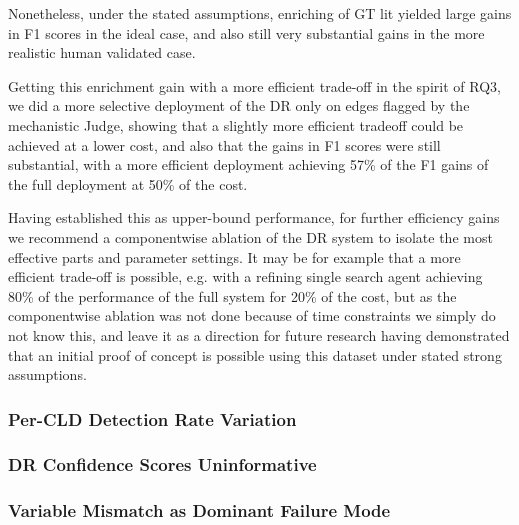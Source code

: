 Nonetheless, under the stated assumptions, enriching of GT lit yielded large gains in F1 scores in the ideal case, and also still very substantial gains in the more realistic human validated case. 

Getting this enrichment gain with a more efficient trade-off in the spirit of RQ3, we did a more selective deployment of the DR only on edges flagged by the mechanistic Judge, showing that a slightly more efficient tradeoff could be achieved at a lower cost, and also that the gains in F1 scores were still substantial, with a more efficient deployment achieving 57\% of the F1 gains of the full deployment at 50\% of the cost.

Having established this as upper-bound performance, for further efficiency gains we recommend a componentwise ablation of the DR system to isolate the most effective parts and parameter settings. It may be for example that a more efficient trade-off is possible, e.g. with a refining single search agent achieving 80\% of the performance of the full system for 20\% of the cost, but as the componentwise ablation was not done because of time constraints we simply do not know this, and leave it as a direction for future research having demonstrated that an initial proof of concept is possible using this dataset under stated strong assumptions.

\subsubsection{Per-CLD Detection Rate Variation}

\subsubsection{DR Confidence Scores Uninformative}

\subsubsection{Variable Mismatch as Dominant Failure Mode}

